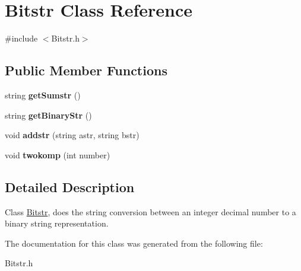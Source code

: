 \hypertarget{class_bitstr}{\section{Bitstr Class Reference}
\label{class_bitstr}
}


{\ttfamily \#include $<$Bitstr.\-h$>$}

\subsection*{Public Member Functions}
\begin{DoxyCompactItemize}
\item 
\hypertarget{class_bitstr_aa02ee12062bd52d5d29252011179c26f}{string {\bfseries get\-Sumstr} ()}\label{class_bitstr_aa02ee12062bd52d5d29252011179c26f}

\item 
\hypertarget{class_bitstr_afdb2caf0822eaab6e0c4bf89ab80078e}{string {\bfseries get\-Binary\-Str} ()}\label{class_bitstr_afdb2caf0822eaab6e0c4bf89ab80078e}

\item 
\hypertarget{class_bitstr_a7309e3d60bcc4bf193258921b27c0936}{void {\bfseries addstr} (string astr, string bstr)}\label{class_bitstr_a7309e3d60bcc4bf193258921b27c0936}

\item 
\hypertarget{class_bitstr_ad05e65eb1a03461da90c73ff3c462949}{void {\bfseries twokomp} (int number)}\label{class_bitstr_ad05e65eb1a03461da90c73ff3c462949}

\end{DoxyCompactItemize}


\subsection{Detailed Description}
Class \hyperlink{class_bitstr}{Bitstr}, does the string conversion between an integer decimal number to a binary string representation. 

The documentation for this class was generated from the following file\-:\begin{DoxyCompactItemize}
\item 
Bitstr.\-h\end{DoxyCompactItemize}

